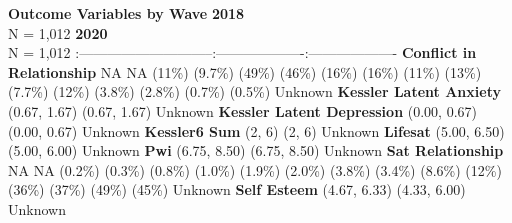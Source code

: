 \documentclass[
  singlecolumn]{article}
\begin{document}
\textbar{}\textbf{Outcome Variables by Wave} \textbar{}\textbf{2018}\\
N = 1,012 \textbar{}\textbf{2020}\\
N = 1,012 \textbar{}
\textbar:-----------------------------\textbar:-------------------\textbar:-------------------\textbar{}
\textbar{}\textbf{Conflict in Relationship} \textbar NA \textbar NA
\textbar{}   (11\%)  (9.7\%) \textbar{}
  (49\%)  (46\%) \textbar{} 
 (16\%)  (16\%) \textbar{}  
(11\%)  (13\%) \textbar{}   (7.7\%)
 (12\%) \textbar{}   (3.8\%) 
(2.8\%) \textbar{}   (0.7\%)  (0.5\%)
\textbar{} \textbar Unknown   \textbar{}
\textbar{}\textbf{Kessler Latent Anxiety}  (0.67, 1.67)
 (0.67, 1.67) \textbar{} \textbar Unknown 
 \textbar{} \textbar{}\textbf{Kessler Latent Depression}
 (0.00, 0.67)  (0.00, 0.67) \textbar{}
\textbar Unknown   \textbar{}
\textbar{}\textbf{Kessler6 Sum}  (2, 6)  (2, 6)
\textbar{} \textbar Unknown   \textbar{}
\textbar{}\textbf{Lifesat}  (5.00, 6.50)  (5.00,
6.00) \textbar{} \textbar Unknown   \textbar{}
\textbar{}\textbf{Pwi}  (6.75, 8.50)  (6.75,
8.50) \textbar{} \textbar Unknown   \textbar{}
\textbar{}\textbf{Sat Relationship} \textbar NA \textbar NA \textbar{}
  (0.2\%)  (0.3\%) \textbar{} 
 (0.8\%)  (1.0\%) \textbar{}  
(1.9\%)  (2.0\%) \textbar{}   (3.8\%)
 (3.4\%) \textbar{}   (8.6\%) 
(12\%) \textbar{}   (36\%)  (37\%)
\textbar{}   (49\%)  (45\%) \textbar{}
\textbar Unknown   \textbar{}
\textbar{}\textbf{Self Esteem}  (4.67, 6.33) 
(4.33, 6.00) \textbar{} \textbar Unknown  
\textbar{}
\end{document}
